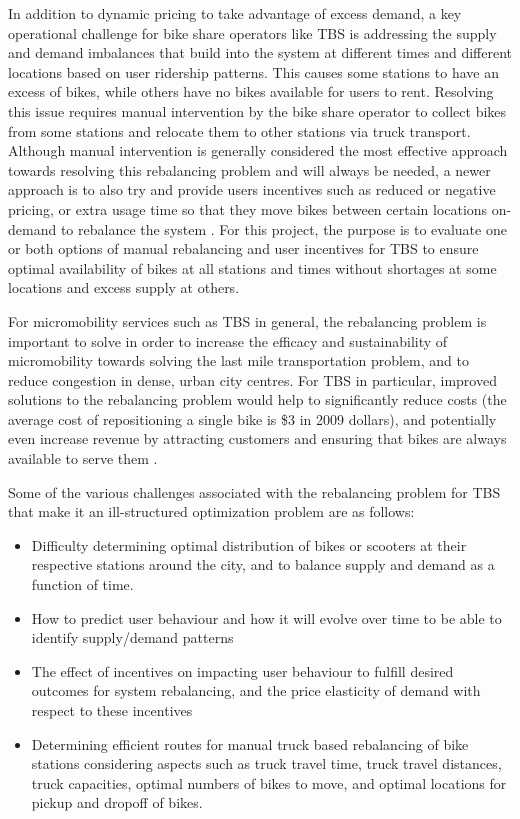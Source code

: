 \documentclass[conference]{IEEEtran}
\begin{document}
In addition to dynamic pricing to take advantage of excess demand, a key operational challenge for bike share operators like TBS is addressing the supply and demand imbalances that build into the system at different times and different locations based on user ridership patterns. This causes some stations to have an excess of bikes, while others have no bikes available for users to rent. Resolving this issue requires manual intervention by the bike share operator to collect bikes from some stations and relocate them to other stations via truck transport. Although manual intervention is generally considered the most effective approach towards resolving this rebalancing problem and will always be needed, a newer approach is to also try and provide users incentives such as reduced or negative pricing, or extra usage time so that they move bikes between certain locations on-demand to rebalance the system \cite{buffalo}\cite{neg_price}. For this project, the purpose is to evaluate one or both options of manual rebalancing and user incentives for TBS to ensure optimal availability of bikes at all stations and times without shortages at some locations and excess supply at others.

For micromobility services such as TBS in general, the rebalancing problem is important to solve in order to increase the efficacy and sustainability of micromobility towards solving the last mile transportation problem, and to reduce congestion in dense, urban city centres. For TBS in particular, improved solutions to the rebalancing problem would help to significantly reduce costs (the average cost of repositioning a single bike is \$3 in 2009 dollars), and potentially even increase revenue by attracting customers and ensuring that bikes are always available to serve them \cite{demaio}.

Some of the various challenges associated with the rebalancing problem for TBS that make it an ill-structured optimization problem are as follows:
\begin{itemize}
\item Difficulty determining optimal distribution of bikes or scooters at their respective stations around the city, and to balance supply and demand as a function of time. 
\item How to predict user behaviour and how it will evolve over time to be able to identify supply/demand patterns 
\item The effect of incentives on impacting user behaviour to fulfill desired outcomes for system rebalancing, and the price elasticity of demand with respect to these incentives
\item Determining efficient routes for manual truck based rebalancing of bike stations considering aspects such as truck travel time, truck travel distances, truck capacities, optimal numbers of bikes to move, and optimal locations for pickup and dropoff of bikes.
\end{itemize}
\end{document}

